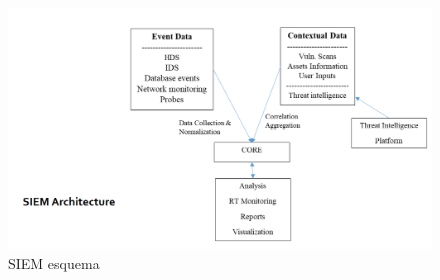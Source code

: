 \begin{enumerate}[resume]
\begin{figure}[htbp]
   \centering
   \includegraphics{images/00/SIEM.png}
   \caption{SIEM esquema}
   \label{fig:00/SIEM}
\end{figure}
\end{enumerate}

\newpage

